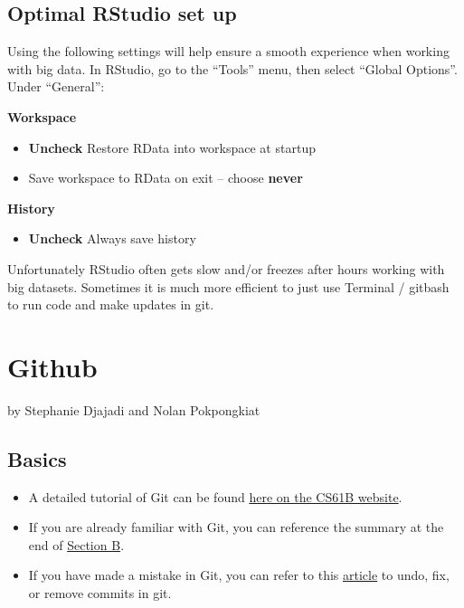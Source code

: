 \documentclass[
]{book}
\providecommand{\tightlist}{%
  \setlength{\itemsep}{0pt}\setlength{\parskip}{0pt}}
\begin{document}
\hypertarget{optimal-rstudio-set-up}{%
\section{Optimal RStudio set up}\label{optimal-rstudio-set-up}}

Using the following settings will help ensure a smooth experience when working with big data. In RStudio, go to the ``Tools'' menu, then select ``Global Options''. Under ``General'':

\textbf{Workspace}

\begin{itemize}
\tightlist
\item
  \textbf{Uncheck} Restore RData into workspace at startup
\item
  Save workspace to RData on exit -- choose \textbf{never}
\end{itemize}

\textbf{History}

\begin{itemize}
\tightlist
\item
  \textbf{Uncheck} Always save history
\end{itemize}

Unfortunately RStudio often gets slow and/or freezes after hours working with big datasets. Sometimes it is much more efficient to just use Terminal / gitbash to run code and make updates in git.

\hypertarget{github}{%
\chapter{Github}\label{github}}

by Stephanie Djajadi and Nolan Pokpongkiat

\hypertarget{basics}{%
\section{Basics}\label{basics}}

\begin{itemize}
\tightlist
\item
  A detailed tutorial of Git can be found \href{https://sp19.datastructur.es/materials/guides/using-git\#b-local-repositories-narrative-introduction}{here on the CS61B website}.
\item
  If you are already familiar with Git, you can reference the summary at the end of \href{https://sp19.datastructur.es/materials/guides/using-git\#b-local-repositories-narrative-introduction}{Section B}.
\item
  If you have made a mistake in Git, you can refer to this \href{https://sethrobertson.github.io/GitFixUm/fixup.html}{article} to undo, fix, or remove commits in git.
\end{itemize}
\end{document}
